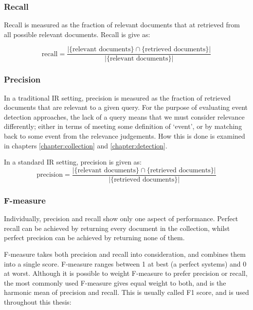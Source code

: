\subsubsection{Recall}

Recall is measured as the fraction of relevant documents that at retrieved from all possible relevant documents. Recall is give as:

\begin{displaymath}
	\text{recall}=\frac{|\{\text{relevant documents}\}\cap\{\text{retrieved documents}\}|}{|\{\text{relevant documents}\}|}
\end{displaymath}

\subsubsection{Precision}
In a traditional IR setting, precision is measured as the fraction of retrieved documents that are relevant to a given query.
For the purpose of evaluating event detection approaches, the lack of a query means that we must consider relevance differently; either in terms of meeting some definition of `event', or by matching back to some event from the relevance judgements.
How this is done is examined in chapters \ref{chapter:collection} and \ref{chapter:detection}.

In a standard IR setting, precision is given as:
\begin{displaymath}
	\text{precision}=\frac{|\{\text{relevant documents}\}\cap\{\text{retrieved documents}\}|}{|\{\text{retrieved documents}\}|}
\end{displaymath}

\subsubsection{F-measure}
Individually, precision and recall show only one aspect of performance.
Perfect recall can be achieved by returning every document in the collection,
whilst perfect precision can be achieved by returning none of them.

F-measure takes both precision and recall into consideration, and combines them into a single score. F-measure ranges between 1 at best (a perfect systems) and 0 at worst. Although it is possible to weight F-measure to prefer precision or recall, the most commonly used F-measure gives equal weight to both, and is the harmonic mean of precision and recall. This is usually called F1 score, and is used throughout this thesis:

